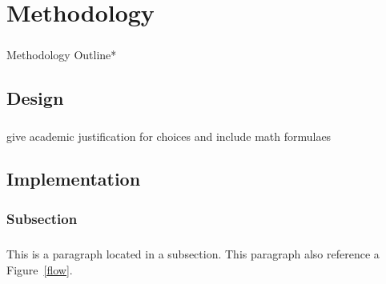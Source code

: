 \chapter{Methodology}
\label{chap:chapter1}

\paragraph{}Methodology Outline*

\section{Design}
\label{sec:section1}
\paragraph{}

\paragraph{}give academic justification for choices and include math formulaes
\section{Implementation}
\label{sec:section2}

\subsection{Subsection} 
\label{ssec:subsection1}


\paragraph{}This is a paragraph located in a subsection.  This paragraph also reference a  Figure~\ref{flow}.


